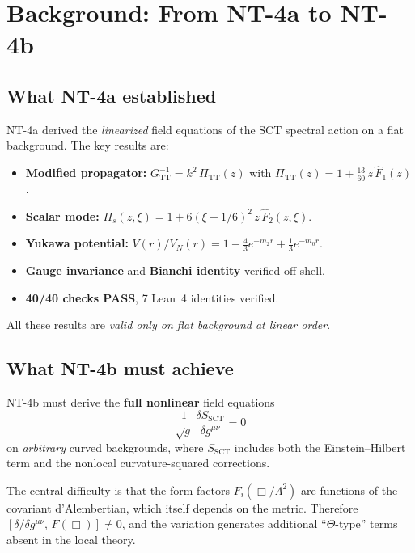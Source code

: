 \documentclass[12pt,a4paper]{article}
\theoremstyle{definition}
\theoremstyle{remark}
\begin{document}
\tableofcontents
\newpage

\section{Background: From NT-4a to NT-4b}
\label{sec:background}

\subsection{What NT-4a established}

NT-4a derived the \emph{linearized} field equations of the SCT spectral
action on a flat background.  The key results are:
\begin{itemize}[nosep]
  \item \textbf{Modified propagator:}
    $G^{-1}_{\mathrm{TT}} = k^2\,\Pi_{\mathrm{TT}}(z)$ with
    $\Pi_{\mathrm{TT}}(z) = 1 + \frac{13}{60}\,z\,\hat{F}_1(z)$.
  \item \textbf{Scalar mode:}
    $\Pi_s(z,\xi) = 1 + 6(\xi-1/6)^2\,z\,\hat{F}_2(z,\xi)$.
  \item \textbf{Yukawa potential:}
    $V(r)/V_N(r) = 1 - \frac{4}{3}e^{-m_2 r} + \frac{1}{3}e^{-m_0 r}$.
  \item \textbf{Gauge invariance} and \textbf{Bianchi identity}
    verified off-shell.
  \item \textbf{40/40 checks PASS}, 7 Lean~4 identities verified.
\end{itemize}
All these results are \emph{valid only on flat background at linear order}.

\subsection{What NT-4b must achieve}

NT-4b must derive the \textbf{full nonlinear} field equations
\begin{equation}\label{eq:NT4b-goal}
  \frac{1}{\sqrt{g}}\,
  \frac{\delta S_{\mathrm{SCT}}}{\delta g^{\mu\nu}} = 0
\end{equation}
on \emph{arbitrary} curved backgrounds, where $S_{\mathrm{SCT}}$ includes
both the Einstein--Hilbert term and the nonlocal curvature-squared
corrections.

The central difficulty is that the form factors $F_i(\Box/\Lambda^2)$
are functions of the covariant d'Alembertian, which itself depends on
the metric.  Therefore $[\delta/\delta g^{\mu\nu},\, F(\Box)] \neq 0$,
and the variation generates additional ``$\Theta$-type'' terms absent
in the local theory.
\end{document}
